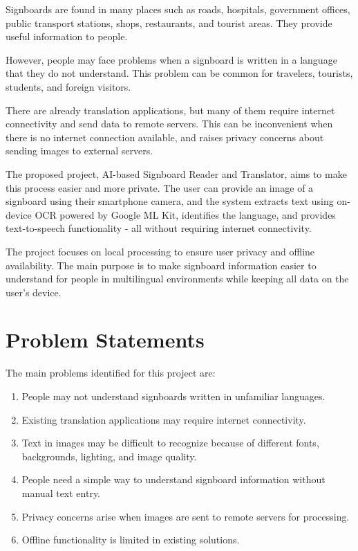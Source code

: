 \documentclass[12pt,a4paper]{report}
\begin{document}
Signboards are found in many places such as roads, hospitals, government offices, public transport stations, shops, restaurants, and tourist areas. They provide useful information to people.

However, people may face problems when a signboard is written in a language that they do not understand. This problem can be common for travelers, tourists, students, and foreign visitors.

There are already translation applications, but many of them require internet connectivity and send data to remote servers. This can be inconvenient when there is no internet connection available, and raises privacy concerns about sending images to external servers.

The proposed project, AI-based Signboard Reader and Translator, aims to make this process easier and more private. The user can provide an image of a signboard using their smartphone camera, and the system extracts text using on-device OCR powered by Google ML Kit, identifies the language, and provides text-to-speech functionality - all without requiring internet connectivity.

The project focuses on local processing to ensure user privacy and offline availability. The main purpose is to make signboard information easier to understand for people in multilingual environments while keeping all data on the user's device. \cite{ref2}

\section{Problem Statements}

The main problems identified for this project are:

\begin{enumerate}
    \item People may not understand signboards written in unfamiliar languages.
    \item Existing translation applications may require internet connectivity.
    \item Text in images may be difficult to recognize because of different fonts, backgrounds, lighting, and image quality.
    \item People need a simple way to understand signboard information without manual text entry.
    \item Privacy concerns arise when images are sent to remote servers for processing.
    \item Offline functionality is limited in existing solutions.
\end{enumerate}
\end{document}
